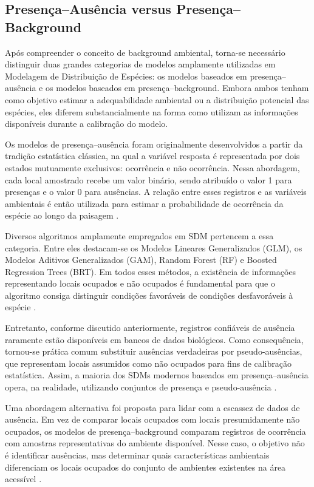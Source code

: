 \subsection{Presença--Ausência versus Presença--Background}

Após compreender o conceito de background ambiental, torna-se necessário distinguir duas grandes categorias de modelos amplamente utilizadas em Modelagem de Distribuição de Espécies: os modelos baseados em presença--ausência e os modelos baseados em presença--background. Embora ambos tenham como objetivo estimar a adequabilidade ambiental ou a distribuição potencial das espécies, eles diferem substancialmente na forma como utilizam as informações disponíveis durante a calibração do modelo.

Os modelos de presença--ausência foram originalmente desenvolvidos a partir da tradição estatística clássica, na qual a variável resposta é representada por dois estados mutuamente exclusivos: ocorrência e não ocorrência. Nessa abordagem, cada local amostrado recebe um valor binário, sendo atribuído o valor 1 para presenças e o valor 0 para ausências. A relação entre esses registros e as variáveis ambientais é então utilizada para estimar a probabilidade de ocorrência da espécie ao longo da paisagem \citep{guisan2005predicting}.

Diversos algoritmos amplamente empregados em SDM pertencem a essa categoria. Entre eles destacam-se os Modelos Lineares Generalizados (GLM), os Modelos Aditivos Generalizados (GAM), Random Forest (RF) e Boosted Regression Trees (BRT). Em todos esses métodos, a existência de informações representando locais ocupados e não ocupados é fundamental para que o algoritmo consiga distinguir condições favoráveis de condições desfavoráveis à espécie \citep{elith2009species}.

Entretanto, conforme discutido anteriormente, registros confiáveis de ausência raramente estão disponíveis em bancos de dados biológicos. Como consequência, tornou-se prática comum substituir ausências verdadeiras por pseudo-ausências, que representam locais assumidos como não ocupados para fins de calibração estatística. Assim, a maioria dos SDMs modernos baseados em presença--ausência opera, na realidade, utilizando conjuntos de presença e pseudo-ausência \citep{barbet2012selecting}.

Uma abordagem alternativa foi proposta para lidar com a escassez de dados de ausência. Em vez de comparar locais ocupados com locais presumidamente não ocupados, os modelos de presença--background comparam registros de ocorrência com amostras representativas do ambiente disponível. Nesse caso, o objetivo não é identificar ausências, mas determinar quais características ambientais diferenciam os locais ocupados do conjunto de ambientes existentes na área acessível \citep{phillips2009sample}.

